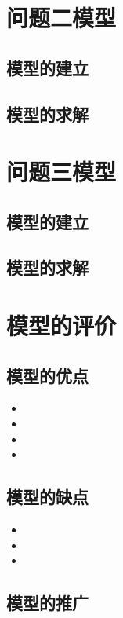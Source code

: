 \documentclass[withoutpreface,bwprint]{cumcmthesis} %
\begin{document}
	\section{问题二模型}
		\subsection{模型的建立}
	
	
		\subsection{模型的求解}
	
	\section{问题三模型}
		\subsection{模型的建立}
	
	
		\subsection{模型的求解}
	
	
	\section{模型的评价}
		\subsection{模型的优点}
			\begin{itemize}
				\item 
				\item 
				\item 
				\item 
			\end{itemize}
		\subsection{模型的缺点}
			\begin{itemize}
				\item 
				\item 
				\item 
			\end{itemize}
		\subsection{模型的推广}
	
\end{document}
